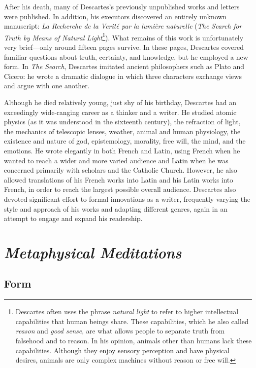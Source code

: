 After his death, many of Descartes's previously unpublished works and letters were published. In addition, his executors discovered an entirely unknown manuscript: \textit{La Recherche de la Verité par la lumière naturelle} (\textit{The Search for Truth by Means of Natural Light}\footnote{Descartes often uses the phrase \textit{natural light} to refer to higher intellectual capabilities that human beings share. These capabilities, which he also called \textit{reason} and \textit{good sense}, are what allows people to separate truth from falsehood and to reason. In his opinion, animals other than humans lack these capabilities. Although they enjoy sensory perception and have physical desires, animals are only complex machines without reason or free will.}). What remains of this work is unfortunately very brief---only around fifteen pages survive. In these pages, Descartes covered familiar questions about truth, certainty, and knowledge, but he employed a new form. In \textit{The Search}, Descartes imitated ancient philosophers such as Plato and Cicero: he wrote a dramatic dialogue in which three characters exchange views and argue with one another.

Although he died relatively young, just shy of his  birthday, Descartes had an exceedingly wide-ranging career as a thinker and a writer. He studied atomic physics (as it was understood in the sixteenth century), the refraction of light, the mechanics of telescopic lenses, weather, animal and human physiology, the existence and nature of god, epistemology, morality, free will, the mind, and the emotions. He wrote elegantly in both French and Latin, using French when he wanted to reach a wider and more varied audience and Latin when he was concerned primarily with scholars and the Catholic Church. However, he also allowed translations of his French works into Latin and his Latin works into French, in order to reach the largest possible overall audience. Descartes also devoted significant effort to formal innovations as a writer, frequently varying the style and approach of his works and adapting different genres, again in an attempt to engage and expand his readership.

\section{\textit{Metaphysical Meditations}}

\subsection*{Form}

